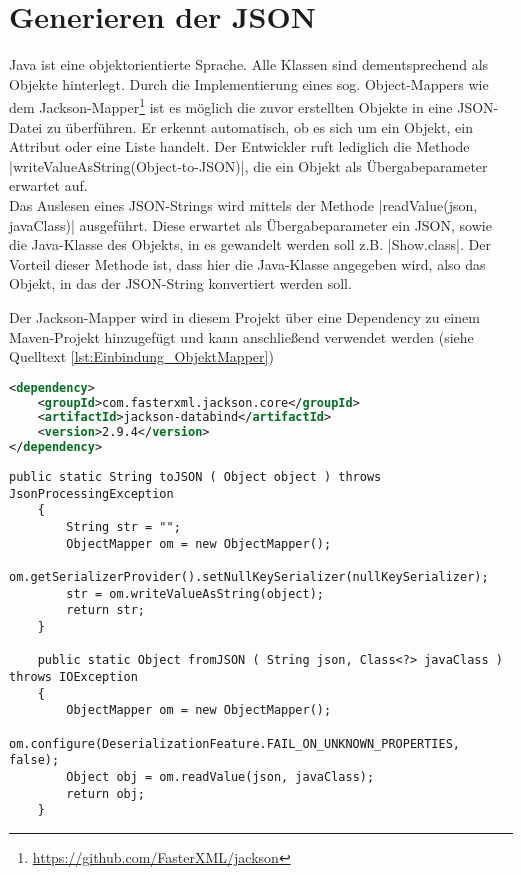 \section{Generieren der \acf{JSON}}
\label{sec:json_generieren}
\authorsection{\authorSG}

Java ist eine objektorientierte Sprache.
Alle Klassen sind dementsprechend als Objekte hinterlegt.
Durch die Implementierung eines sog. Object-Mappers wie dem Jackson-Mapper\footnote{\url{https://github.com/FasterXML/jackson}}
ist es möglich die zuvor erstellten Objekte in eine \acs{JSON}-Datei zu überführen.
Er erkennt automatisch, ob es sich um ein Objekt, ein Attribut oder eine Liste handelt.
Der Entwickler ruft lediglich die Methode \jinline |writeValueAsString(Object-to-JSON)|, die ein Objekt als Übergabeparameter erwartet auf. \\
Das Auslesen eines \acs{JSON}-Strings wird mittels der Methode \jinline |readValue(json, javaClass)| ausgeführt. 
Diese erwartet als Übergabeparameter ein \acs{JSON}, sowie die Java-Klasse des Objekts, in es gewandelt werden soll z.B. \jinline |Show.class|. 
Der Vorteil dieser Methode ist, dass hier die Java-Klasse angegeben wird, also das Objekt, in das der \acs{JSON}-String konvertiert werden soll.

Der Jackson-Mapper wird in diesem Projekt über eine Dependency zu einem Maven-Projekt hinzugefügt und kann anschließend verwendet werden (siehe Quelltext \ref{lst:Einbindung_ObjektMapper}) %

\begin{minipage}{\linewidth}
\begin{lstlisting}[language=XML]
<dependency>
	<groupId>com.fasterxml.jackson.core</groupId>
	<artifactId>jackson-databind</artifactId>
	<version>2.9.4</version>
</dependency>
\end{lstlisting}
\label{lst:Einbindung_ObjektMapper}
\end{minipage}

\begin{minipage}{\linewidth}
	\begin{lstlisting}[style=lstJava]
	public static String toJSON ( Object object ) throws JsonProcessingException
	{
		String str = "";
		ObjectMapper om = new ObjectMapper();
		om.getSerializerProvider().setNullKeySerializer(nullKeySerializer);
		str = om.writeValueAsString(object);
		return str;
	}
	
	public static Object fromJSON ( String json, Class<?> javaClass ) throws IOException
	{
		ObjectMapper om = new ObjectMapper();
		om.configure(DeserializationFeature.FAIL_ON_UNKNOWN_PROPERTIES, false);
		Object obj = om.readValue(json, javaClass);
		return obj;
	}
	\end{lstlisting}
\end{minipage}
